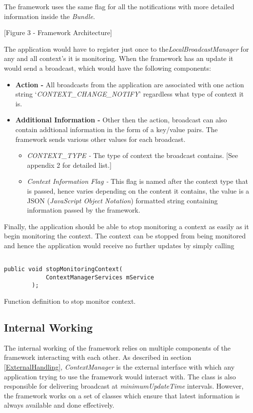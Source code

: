 \documentclass[12pt]{report}
\begin{document}
The framework uses the same flag for all the notifications with more detailed information inside the \textit{Bundle}.

[Figure 3 - Framework Architecture]

The application would have to register just once to the\textit{LocalBroadcastManager} for any and all context's it is monitoring. When the framework has an update it would send a broadcast, which would have the following components:
\begin{itemize}
\item \textbf{Action - } All broadcasts from the application are associated with one action string `\textit{CONTEXT\_CHANGE\_NOTIFY}' regardless what type of context it is.
\item \textbf{Additional Information - } Other then the action, broadcast can also contain addtional information in the form of a key/value pairs. The framework sends various other values for each broadcast.
    \begin{itemize}
    \item \textit{CONTEXT\_TYPE - }The type of context the broadcast contains. [See appendix 2 for detailed list.]
    \item \textit{Context Information Flag - }This flag is named after the context type that is passed, hence varies depending on the content it contains, the value is a JSON (\textit{JavaScript Object Notation}) formatted string containing information passed by the framework.
    \end{itemize}
\end{itemize}

Finally, the application should be able to stop monitoring a context as easily as it begin monitoring the context. The context can be stopped from being monitored and hence the application would receive no further updates by simply calling

\begin{program}
  \begin{verbatim}

public void stopMonitoringContext(
            ContextManagerServices mService
        );
\end{verbatim}
\label{monitorContextStopCall}
\caption{Function definition to stop monitor context.}
\end{program}

\subsection{Internal Working}
The internal working of the framework relies on multiple components of the framework interacting with each other. As described in section \ref{ExternalHandling}, \textit{ContextManager} is the external interface with which any application trying to use the framework would interact with. The class is also responsible for delivering broadcast at \textit{minimumUpdateTime} intervals. However, the framework works on a set of classes which ensure that latest information is always available and done effectively.
\end{document}
